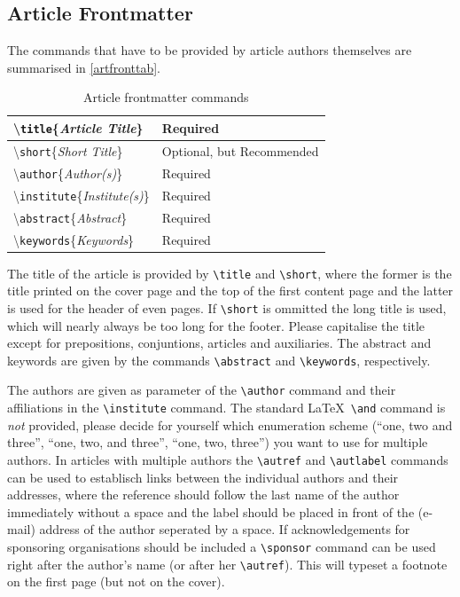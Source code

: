 \documentclass{eceasst}
\begin{document}
\subsection{Article Frontmatter}\label{artfront}
The commands that have to be provided by article authors themselves are
summarised in \autoref{artfronttab}.
\begin{table}
\centering
\caption{Article frontmatter commands}\label{artfronttab}
\begin{tabular}{|l|l|}
\hline
\textbackslash\texttt{title}\{\textit{Article Title}\} &
Required \\\hline
\textbackslash\texttt{short}\{\textit{Short Title}\} &
Optional, but Recommended \\\hline
\textbackslash\texttt{author}\{\textit{Author(s)}\} &
Required \\\hline
\textbackslash\texttt{institute}\{\textit{Institute(s)}\} &
Required \\\hline
\textbackslash\texttt{abstract}\{\textit{Abstract}\} &
Required \\\hline
\textbackslash\texttt{keywords}\{\textit{Keywords}\} &
Required \\\hline
\end{tabular}
\end{table}
The title of the article is provided by \verb|\title| and \verb|\short|, where
the former is the title printed on the cover page and the top of the first
content page and the latter is used for the header of even pages.
If \verb|\short| is ommitted the long title is used, which will nearly always
be too long for the footer.
Please capitalise the title except for prepositions, conjuntions, articles
and auxiliaries.
The abstract and keywords are given by the commands \verb|\abstract| and
\verb|\keywords|, respectively.

The authors are given as parameter of the \verb|\author| command and their
affiliations in the \verb|\institute| command.
The standard \LaTeX\ \verb|\and| command is \emph{not} provided, please decide
for yourself which enumeration scheme (``one, two and three'', ``one, two, and
three'', ``one, two, three'') you want to use for multiple authors.
In articles with multiple authors the \verb|\autref| and \verb|\autlabel|
commands can be used to establisch links between the individual authors and
their addresses, where the reference should follow the last name of the author
immediately without a space and the label should be placed in front of the
(e-mail) address of the author seperated by a space.
If acknowledgements for sponsoring organisations should be included a
\verb|\sponsor| command can be used right after the author's name (or after
her \verb|\autref|).
This will typeset a footnote on the first page (but not on the cover).
\end{document}
